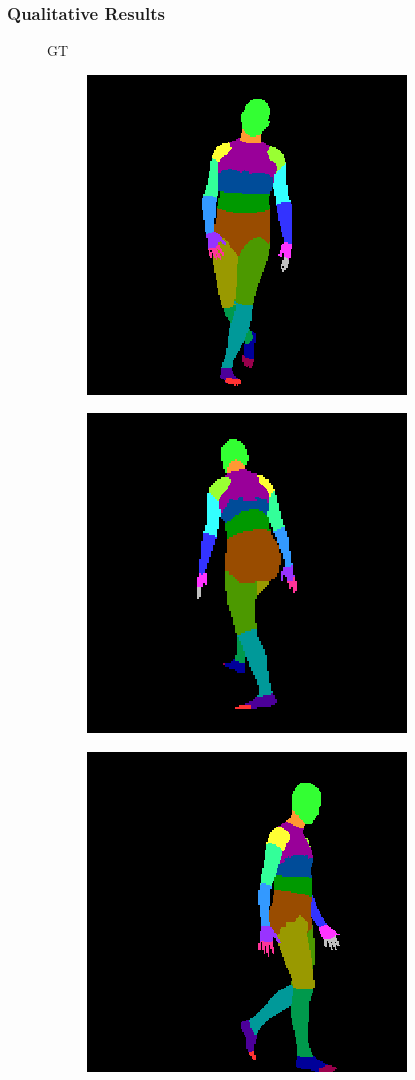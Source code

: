\documentclass{beamer}
\begin{document}
\begin{frame}
\frametitle{Qualitative Results}

\begin{figure}
GT
\centering
\begin{subfigure}{.19\textwidth}
\centering
  \includegraphics[scale=0.12]{ung_104_36_c0011_segm_7.png}
\end{subfigure}
\begin{subfigure}{.19\textwidth}
  \centering
  \includegraphics[scale=0.12]{36_10_c0019_segm_10.png}
\end{subfigure}
\begin{subfigure}{.19\textwidth}
  \centering
  \includegraphics[scale=0.12]{40_02_c0011_segm_19.png}

\end{subfigure}
\end{figure}
\end{frame}
\end{document}
